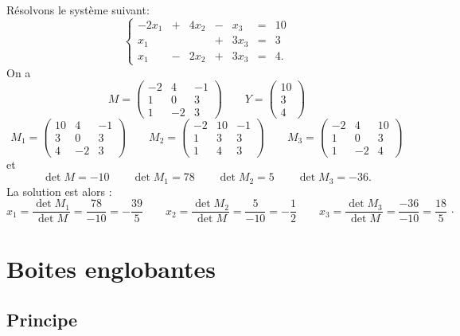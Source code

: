 \documentclass[11pt,class=report,crop=false]{standalone}
\begin{document}
\begin{exemple} Résolvons le système suivant:
\[\left\{
\begin{array}{ccccccc}
	-2x_1 &+ &4x_2 &- &x_3 & = & 10\\		
	x_1 & && + &3x_3 & = &3\\
	x_1 &- &2x_2 &+ &3 x_3 & = & 4. \end{array}
\right. \]
On a
\[
M = \begin{pmatrix}
	-2 & 4 & -1\\
	1 & 0 & 3\\
	1 & -2 & 3
\end{pmatrix}
\qquad
Y = \begin{pmatrix}10 \\ 3 \\ 4 \end{pmatrix}
\]
\[
M_1 = \begin{pmatrix}
	10 & 4 & -1\\
	3 & 0 & 3\\
	4 & -2 & 3
\end{pmatrix}
\qquad
M_2 = \begin{pmatrix}
	-2 & 10 & -1\\
	1 & 3 & 3\\
	1 & 4 & 3
\end{pmatrix}
\qquad
M_3 = \begin{pmatrix}
	-2 & 4 & 10\\
	1 & 0 & 3\\
	1 & -2 & 4
\end{pmatrix}
\]
et
$$\det M  =  -10 \qquad \det M_1  = 78  \qquad
\det M_2  = 5  \qquad \det M_3  = -36.$$
La solution est alors :
\[
x_1 = \frac{\det M_1}{\det M} =  \frac{78}{-10}=  -\frac{39}{5}\qquad
x_2 = \frac{\det M_2}{\det M} =  \frac{5}{-10}=  -\frac{1}{2}\qquad
x_3 = \frac{\det M_3}{\det M} = \frac{-36}{-10}=  \frac{18}{5} \, \cdotp
\]
\end{exemple}



\section{Boites englobantes}


\subsection{Principe}
\end{document}
